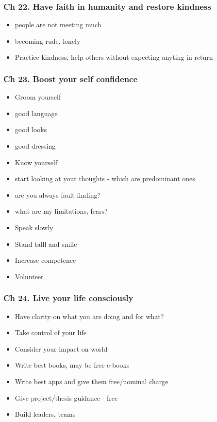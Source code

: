 \begin{frame}[fragile]
\frametitle{Ch 22. Have faith in humanity and restore kindness}
\begin{itemize}
\item people are not meeting much
\item becoming rude, lonely
\item Practice kindness, help others without expecting anyting in return
\end{itemize}
\end{frame}

\begin{frame}[fragile]
\frametitle{Ch 23. Boost your self confidence}
\begin{itemize}
\item Groom yourself
\item good language
\item good looks
\item good dressing
\item Know yourself
\item start looking at your thoughts - which are predominant ones
\item are you always fault finding?
\item what are my limitations, fears?
\item Speak slowly
\item Stand talll and smile
\item Increase competence
\item Volunteer
\end{itemize}
\end{frame}

\begin{frame}[fragile]
\frametitle{Ch 24. Live your life consciously}
\begin{itemize}
\item Have clarity on what you are doing and for what?
\item Take control of your life
\item Consider your impact on world
\item Write best books, may be free e-books
\item Write best apps and give them free/nominal charge
\item Give project/thesis guidance - free
\item Build leaders, teams
\end{itemize}
\end{frame}
